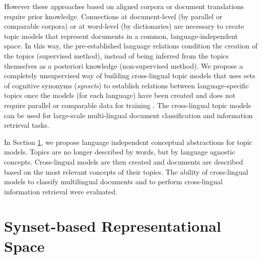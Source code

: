 However these approaches based on aligned corpora or document translations require prior knowledge. Connections at document-level (by parallel or comparable corpora) or at word-level (by dictionaries) are necessary to create topic models that represent documents in a common, language-independent space. In this way, the pre-established language relations condition the creation of the topics (supervised method), instead of being inferred from the topics themselves as a posteriori knowledge (non-supervised method). We propose a completely unsupervised way of building cross-lingual topic models that uses sets of cognitive synonyms (\textit{synsets}) to establish relations between language-specific topics once the models (for each language) have been created and does not require parallel or comparable data for training \citep{Badenes-Olmedo2019, Badenes-Olmedo2019b}. The cross-lingual topic models can be used for large-scale multi-lingual document classification and information retrieval tasks.

In Section \ref{sec:synset-space}, we propose language independent conceptual abstractions for topic models. Topics are no longer described by words, but by language agnostic concepts. Cross-lingual models are then created and documents are described based on the most relevant concepts of their topics. The ability of cross-lingual models to classify multilingual documents and to perform cross-lingual information retrieval were evaluated.

\section{Synset-based Representational Space}
\label{sec:synset-space}

